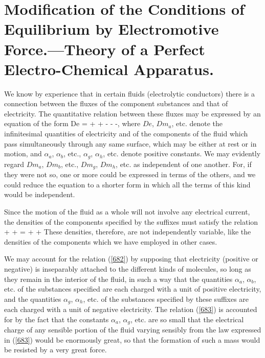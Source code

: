 \documentclass[12pt]{article}
\begin{document}
\section{Modification of the Conditions of Equilibrium  by Electromotive Force.---Theory of a Perfect Electro-Chemical Apparatus.}
We know by experience that in certain fluids (electrolytic conductors) there is a connection between the fluxes of the component substances and that of electricity. The quantitative relation between these fluxes may be expressed by an equation of the form
\eqs De = +  + -  -  -,    \label{682} \eqe
where $De$, $Dm_a$, etc. denote the infinitesimal quantities of electricity and of the components of the fluid which pass simultaneously through any same surface, which may be either at rest or in motion, and $\alpha_a$, $\alpha_b$, etc., $\alpha_g$, $\alpha_h$, etc. denote positive constants. We may evidently regard $Dm_a$, $Dm_b$, etc., $Dm_g$, $Dm_h$, etc. as independent of one another. For, if they were not so, one or more could be expressed in terms of the others, and we could reduce the equation to a shorter form in which all the terms of this kind would be independent.

Since the motion of the fluid as a whole will not involve any electrical current, the densities of the components specified by the suffixes must satisfy the relation
\eqs {} + +  =  + +     \label{683} \eqe
These densities, therefore, are not independently variable, like the densities of the components which we have employed in other cases.

We may account for the relation (\ref{682}) by supposing that electricity (positive or negative) is inseparably attached to the different kinds of molecules, so long as they remain in the interior of the fluid, in such a way that the quantities $\alpha_a$, $\alpha_b$, etc. of the substances specified are each charged with a unit of positive electricity, and the quantities $\alpha_g$, $\alpha_h$, etc. of the substances specified by these suffixes are each charged with a unit of negative electricity. The relation (\ref{683}) is accounted for by the fact that the constants $\alpha_a$, $\alpha_g$, etc. are so small that the electrical charge of any sensible portion of the fluid varying sensibly from the law  expressed in (\ref{683}) would be enormously great, so that the formation of such a mass would be resisted by a very great force.
\end{document}
